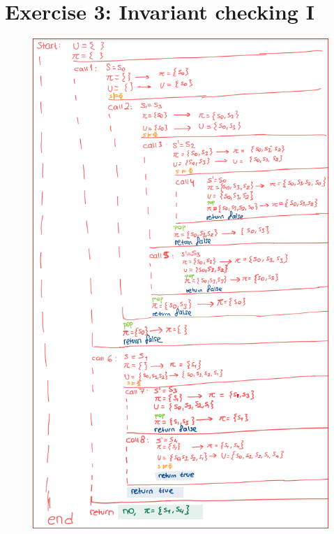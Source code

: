 \documentclass{article}
\begin{document}
\newpage
\section*{Exercise 3: Invariant checking I}
\begin{figure}[H]
    \centering
    \includegraphics[width=5in]{images/03.png}
    \label{fig:03}
\end{figure}


\newpage
\end{document}
